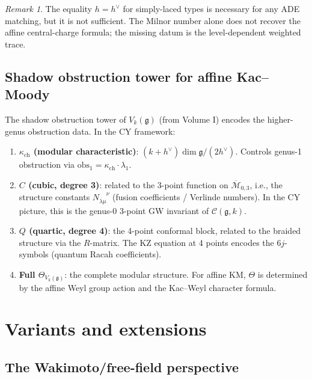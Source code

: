 \documentclass[11pt]{article}
\theoremstyle{definition}
\theoremstyle{remark}
\newtheorem{remark}[theorem]{Remark}
\newcommand{\cC}{\mathcal{C}}
\newcommand{\frakg}{\mathfrak{g}}
\newcommand{\hv}{h^\vee}
\begin{document}
\begin{remark}
The equality $h = \hv$ for simply-laced types is necessary for any ADE
matching, but it is not sufficient. The Milnor number alone does not
recover the affine central-charge formula; the missing datum is the
level-dependent weighted trace.
\end{remark}

\subsection{Shadow obstruction tower for affine Kac--Moody}
\label{subsec:shadow-tower-km}

The shadow obstruction tower of $V_k(\frakg)$ (from Volume I) encodes the
higher-genus obstruction data. In the CY framework:

\begin{enumerate}[label=\textbf{Level \arabic*.}]
 \item \textbf{$\kappa_{\mathrm{ch}}$ (modular characteristic)}: $(k+\hv)\dim\frakg/(2\hv)$.
 Controls genus-1 obstruction via $\mathrm{obs}_1 = \kappa_{\mathrm{ch}} \cdot \lambda_1$.
 \item \textbf{$C$ (cubic, degree 3)}: related to the 3-point function
 on $\overline{\mathcal{M}}_{0,3}$, i.e., the structure constants
 $N_{\lambda\mu}^{\phantom{\lambda\mu}\nu}$ (fusion coefficients /
 Verlinde numbers). In the CY picture, this is the genus-0 3-point
 GW invariant of $\cC(\frakg, k)$.
 \item \textbf{$Q$ (quartic, degree 4)}: the 4-point conformal block,
 related to the braided structure via the $R$-matrix. The KZ equation
 at 4 points encodes the $6j$-symbols (quantum Racah coefficients).
 \item \textbf{Full $\Theta_{V_k(\frakg)}$}: the complete modular
 structure. For affine KM, $\Theta$ is determined by the affine
 Weyl group action and the Kac--Weyl character formula.
\end{enumerate}

\section{Variants and extensions}
\label{sec:variants}

\subsection{The Wakimoto/free-field perspective}
\label{subsec:wakimoto}
\end{document}
